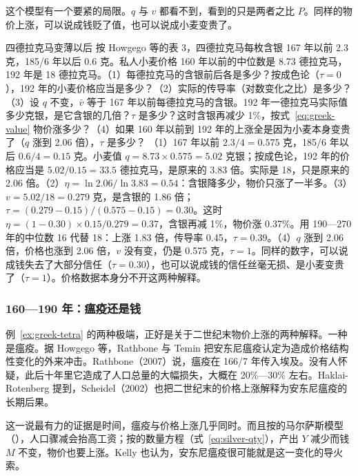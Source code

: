 这个模型有一个要紧的局限。$q$ 与 $v$ 都看不到，看到的只是两者之比 $P$。同样的物价上涨，可以说成钱贬了值，也可以说成小麦变贵了。

\begin{example}{四德拉克马变薄以后}\label{ex:greek-tetra}
按 Howgego 等的表 3，四德拉克马每枚含银 167 年以前 2.3 克，185/6 年以后 0.6 克\cite{howgego2010}。私人小麦价格 160 年以前的中位数是 8.73 德拉克马，192 年是 18 德拉克马。（1）每德拉克马的含银前后各是多少？按成色论（$\tau=0$），192 年的小麦价格应当是多少？（2）实际的传导率（对数变化之比）是多少？（3）设 $q$ 不变，$\bar v$ 等于 167 年以前每德拉克马的含银。192 年一德拉克马实际值多少克银，是它含银的几倍？$\tau$ 是多少？这时含银再减少 1\%，按式~\eqref{eq:greek-value} 物价涨多少？（4）如果 160 年以前到 192 年的上涨全是因为小麦本身变贵了（$q$ 涨到 2.06 倍），$\tau$ 是多少？
\solution （1）167 年以前 $2.3/4=0.575$ 克，185/6 年以后 $0.6/4=0.15$ 克。小麦值 $q=8.73\times0.575=5.02$ 克银；按成色论，192 年的价格应当是 $5.02/0.15=33.5$ 德拉克马，是原来的 3.83 倍。实际是 18，只是原来的 2.06 倍。（2）$\eta=\ln2.06/\ln3.83=0.54$：含银降多少，物价只涨了一半多。（3）$v=5.02/18=0.279$ 克，是含银的 1.86 倍；$\tau=(0.279-0.15)/(0.575-0.15)=0.30$。这时 $\eta=(1-0.30)\times0.15/0.279=0.37$，含银再减 1\%，物价涨 0.37\%。用 190—270 年的中位数 16 代替 18：上涨 1.83 倍，传导率 0.45，$\tau=0.39$。（4）$q$ 涨到 2.06 倍，价格也涨到 2.06 倍，$v$ 没有变，仍是 0.575 克，$\tau=1$。同样的数字，可以说成钱失去了大部分信任（$\tau=0.30$），也可以说成钱的信任丝毫无损、是小麦变贵了（$\tau=1$）。价格数据本身分不开这两种解释。
\end{example}

\subsubsection{160—190 年：瘟疫还是钱}
例~\ref{ex:greek-tetra} 的两种极端，正好是关于二世纪末物价上涨的两种解释。一种是瘟疫。据 Howgego 等，Rathbone 与 Temin 把安东尼瘟疫认定为造成价格结构性变化的外来冲击。Rathbone（2007）说，瘟疫在 166/7 年传入埃及。没有人怀疑，此后十年里它造成了人口总量的大幅损失，大概在 20\%—30\% 左右\cite{howgego2010}。Haklai-Rotenberg 提到，Scheidel（2002）也把二世纪末的价格上涨解释为安东尼瘟疫的长期后果\cite{haklai2011}。

这一说最有力的证据是时间，瘟疫与价格上涨几乎同时。而且按的马尔萨斯模型（），人口骤减会抬高工资；按的数量方程（式~\eqref{eq:silver-qty}），产出 $Y$ 减少而钱 $M$ 不变，物价也要上涨。Kelly 也认为，安东尼瘟疫很可能就是这一变化的导火索\cite{kelly2021}。

